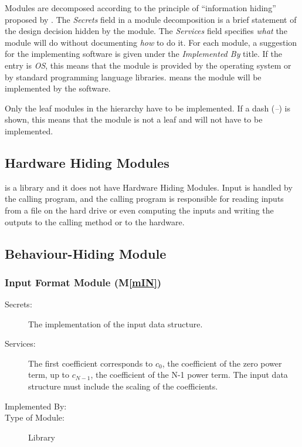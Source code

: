 \documentclass[12pt, titlepage]{article}
\newcommand{\mref}[1]{M\ref{#1}}
\begin{document}
Modules are decomposed according to the principle of ``information hiding''
proposed by \citet{ParnasEtAl1984}. The \emph{Secrets} field in a module
decomposition is a brief statement of the design decision hidden by the
module. The \emph{Services} field specifies \emph{what} the module will do
without documenting \emph{how} to do it. For each module, a suggestion for the
implementing software is given under the \emph{Implemented By} title. If the
entry is \emph{OS}, this means that the module is provided by the operating
system or by standard programming language libraries.  \emph{} means the
module will be implemented by the  software.

Only the leaf modules in the hierarchy have to be implemented. If a dash
(\emph{--}) is shown, this means that the module is not a leaf and will not have
to be implemented.

\subsection{Hardware Hiding Modules}

 is a library and it does not have Hardware Hiding Modules.
Input is handled by the calling program, and the calling program is responsible for
reading inputs from a file on the hard drive or even computing the inputs and writing the outputs
to the calling method or to the hardware.
\subsection{Behaviour-Hiding Module}

\subsubsection{Input Format Module (\mref{mIN})}

\begin{description}
\item[Secrets:] The implementation of the input data structure.
\item[Services:] The first coefficient corresponds to $c_0$, the coefficient of the zero
  power term, up to $c_{N-1}$,  the coefficient of the N-1 power term. The input data
  structure must include the scaling of the coefficients.
\item[Implemented By:] 
\item[Type of Module:] Library
\end{description}
\end{document}
